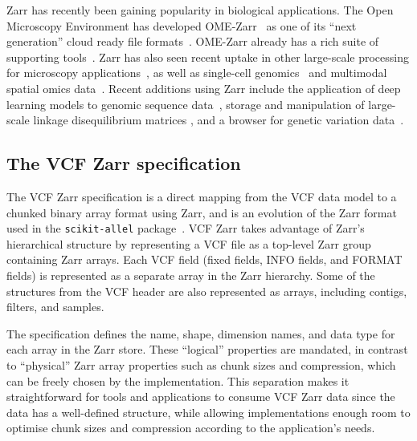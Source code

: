 \documentclass[a4paper,num-refs]{oup-contemporary}
\begin{document}
Zarr has recently been gaining popularity in biological applications.
The Open Microscopy Environment has developed OME-Zarr~\cite{moore2023ome} as one
of its ``next generation'' cloud ready file formats~\citep{moore2021ome}.
OME-Zarr already has a rich suite of supporting
tools~\cite{moore2023ome,rzepka2023toward}.
Zarr has also seen recent uptake in other large-scale processing for
microscopy applications~\citep{ruan2024image}, as well as
single-cell genomics~\citep{dhapola2022scarf,virshup2023scverse}
and multimodal spatial omics
data~\citep{marconato2024spatialdata,baker2023emobject}.
Recent additions using Zarr include the application of deep learning
models to genomic sequence data~\citep{klie2023predictive}, storage and
manipulation of large-scale linkage disequilibrium matrices
\cite{zabad2023fast,zabad2025towards},
and a browser for genetic variation data~\citep{konig2023divbrowse}.

\subsection{The VCF Zarr specification}
The VCF Zarr specification is a direct mapping from the VCF data model
to a chunked binary array format using Zarr,
and is an evolution of the Zarr format used in the \texttt{scikit-allel}
package~\citep{miles2023scikit}.
VCF Zarr takes advantage
of Zarr's hierarchical structure by representing a VCF file as a top-level
Zarr group containing Zarr arrays. Each VCF field (fixed fields, INFO fields,
and FORMAT fields) is represented as a separate array in the Zarr hierarchy.
Some of the structures from the VCF header are also represented as arrays,
including contigs, filters, and samples.

The specification defines the name, shape, dimension names, and data type
for each array in the Zarr store. These ``logical'' properties are mandated,
in contrast to ``physical'' Zarr array properties such as chunk sizes and
compression, which can be freely chosen by the implementation. This
separation makes it straightforward for tools and applications to consume
VCF Zarr data since the data has a well-defined structure, while allowing
implementations enough room to optimise chunk sizes and compression
according to the application's needs.
\end{document}
